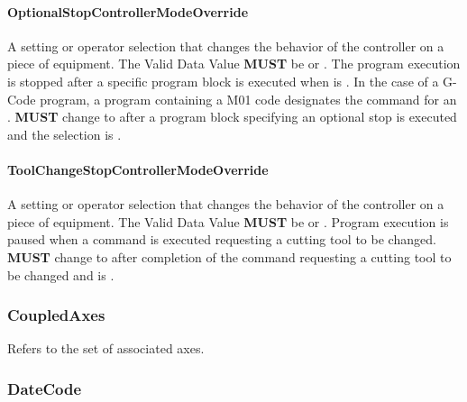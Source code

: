 \paragraph{OptionalStopControllerModeOverride}\mbox{}
\label{sec:OptionalStopControllerModeOverride}



A setting or operator selection that changes the behavior of the controller on a piece of equipment. 
 The \gls{Valid Data Value} \textbf{MUST} be  or .
 The program execution is stopped after a specific program block is executed when  is .    
 In the case of a G-Code program, a program  containing a M01 code designates the command for an . 
  \textbf{MUST} change to  after a program block specifying an optional stop is executed and the  selection is .


\paragraph{ToolChangeStopControllerModeOverride}\mbox{}
\label{sec:ToolChangeStopControllerModeOverride}



A setting or operator selection that changes the behavior of the controller on a piece of equipment. 
 The \gls{Valid Data Value} \textbf{MUST} be  or . 
 Program execution is paused when a command is executed requesting a cutting tool to be changed. 
  \textbf{MUST} change to  after completion of the command requesting a cutting tool to be changed and  is .


\subsubsection{CoupledAxes}
\label{sec:CoupledAxes}



Refers to the set of associated axes.

\FloatBarrier

\subsubsection{DateCode}
\label{sec:DateCode}



